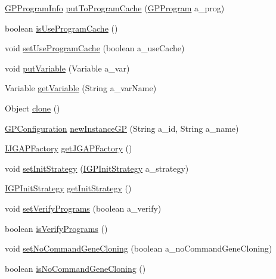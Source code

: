\begin{DoxyCompactItemize}
\item 
\hyperlink{classorg_1_1jgap_1_1gp_1_1impl_1_1_g_p_program_info}{G\-P\-Program\-Info} \hyperlink{classorg_1_1jgap_1_1gp_1_1impl_1_1_g_p_configuration_af4ea6ab8627ec95a73e17ff14b98f6f9}{put\-To\-Program\-Cache} (\hyperlink{classorg_1_1jgap_1_1gp_1_1impl_1_1_g_p_program}{G\-P\-Program} a\-\_\-prog)
\item 
boolean \hyperlink{classorg_1_1jgap_1_1gp_1_1impl_1_1_g_p_configuration_a531a827af9545079a1a20c78a9294e29}{is\-Use\-Program\-Cache} ()
\item 
void \hyperlink{classorg_1_1jgap_1_1gp_1_1impl_1_1_g_p_configuration_a34d9bd15c52208083b649c722be6b380}{set\-Use\-Program\-Cache} (boolean a\-\_\-use\-Cache)
\item 
void \hyperlink{classorg_1_1jgap_1_1gp_1_1impl_1_1_g_p_configuration_a1c82b2defb6f5b7f190808a05d471852}{put\-Variable} (Variable a\-\_\-var)
\item 
Variable \hyperlink{classorg_1_1jgap_1_1gp_1_1impl_1_1_g_p_configuration_a2888461089f058ec9cb397f2050e729b}{get\-Variable} (String a\-\_\-var\-Name)
\item 
Object \hyperlink{classorg_1_1jgap_1_1gp_1_1impl_1_1_g_p_configuration_ae377f05bf1c82e3be3cfd872cafd2ed1}{clone} ()
\item 
\hyperlink{classorg_1_1jgap_1_1gp_1_1impl_1_1_g_p_configuration}{G\-P\-Configuration} \hyperlink{classorg_1_1jgap_1_1gp_1_1impl_1_1_g_p_configuration_a35dc7d18a6256cddae069533506f7edf}{new\-Instance\-G\-P} (String a\-\_\-id, String a\-\_\-name)
\item 
\hyperlink{interfaceorg_1_1jgap_1_1_i_j_g_a_p_factory}{I\-J\-G\-A\-P\-Factory} \hyperlink{classorg_1_1jgap_1_1gp_1_1impl_1_1_g_p_configuration_a79bb213760acb98b012bed7d795b60cc}{get\-J\-G\-A\-P\-Factory} ()
\item 
void \hyperlink{classorg_1_1jgap_1_1gp_1_1impl_1_1_g_p_configuration_a503eb8b5ec119fe824a37bf1d55882f8}{set\-Init\-Strategy} (\hyperlink{interfaceorg_1_1jgap_1_1gp_1_1_i_g_p_init_strategy}{I\-G\-P\-Init\-Strategy} a\-\_\-strategy)
\item 
\hyperlink{interfaceorg_1_1jgap_1_1gp_1_1_i_g_p_init_strategy}{I\-G\-P\-Init\-Strategy} \hyperlink{classorg_1_1jgap_1_1gp_1_1impl_1_1_g_p_configuration_a220df6933c171f5263d0097464d61a53}{get\-Init\-Strategy} ()
\item 
void \hyperlink{classorg_1_1jgap_1_1gp_1_1impl_1_1_g_p_configuration_a98205eeb269c88d89e5db21797fc3dc1}{set\-Verify\-Programs} (boolean a\-\_\-verify)
\item 
boolean \hyperlink{classorg_1_1jgap_1_1gp_1_1impl_1_1_g_p_configuration_a59b2864e905e01900340edb37d3f6a94}{is\-Verify\-Programs} ()
\item 
void \hyperlink{classorg_1_1jgap_1_1gp_1_1impl_1_1_g_p_configuration_ae4517f171caf9f40db941ca2d9053020}{set\-No\-Command\-Gene\-Cloning} (boolean a\-\_\-no\-Command\-Gene\-Cloning)
\item 
boolean \hyperlink{classorg_1_1jgap_1_1gp_1_1impl_1_1_g_p_configuration_a7a2c517e36f51f4e2be5d32fd4b7def2}{is\-No\-Command\-Gene\-Cloning} ()
\end{DoxyCompactItemize}
